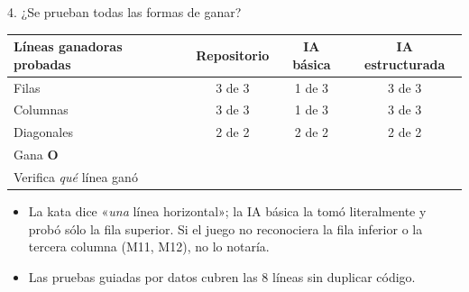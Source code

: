 \documentclass[aspectratio=169,10pt]{beamer}
\newcommand{\si}{\textcolor{ok}{\ding{51}}}
\newcommand{\no}{\textcolor{mal}{\ding{55}}}
\newcommand{\repo}{\textbf{Repositorio}}
\newcommand{\iab}{\textbf{IA básica}}
\newcommand{\iae}{\textbf{IA estructurada}}
\begin{document}
\begin{frame}{4. ¿Se prueban todas las formas de ganar?}
  \centering
  \small
  \begin{tabular}{lccc}
    \toprule
    \textbf{Líneas ganadoras probadas} & \repo & \iab & \iae \\
    \midrule
    Filas                       & 3 de 3 & 1 de 3 & 3 de 3 \\
    Columnas                    & 3 de 3 & 1 de 3 & 3 de 3 \\
    Diagonales                  & 2 de 2 & 2 de 2 & 2 de 2 \\
    Gana \textcolor{colorO}{\textbf{O}} & \si & \si & \no \\
    Verifica \emph{qué} línea ganó & \si & \no & \si \\
    \bottomrule
  \end{tabular}
  \vfill
  \raggedright
  \begin{itemize}
    \item La kata dice «\emph{una} línea horizontal»; la IA básica la tomó literalmente y probó sólo la fila
      superior. Si el juego no reconociera la fila inferior o la tercera columna (M11, M12), no lo notaría.
    \item Las pruebas guiadas por datos cubren las 8 líneas sin duplicar código.
  \end{itemize}
\end{frame}
\end{document}
